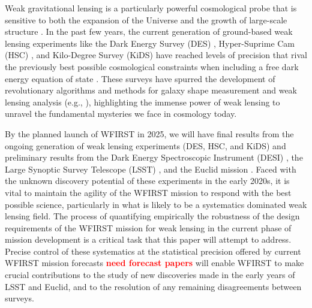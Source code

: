 \documentclass[aps,prd, amsmath,amssymb,superscriptaddress,showkeys,nofootinbib,reprint,preprintnumbers]{revtex4-1}
\newcommand{\verify}[1]{\textcolor{red}{\textbf{{#1}}}}
\begin{document}
Weak gravitational lensing is a particularly powerful cosmological probe that is sensitive to both the expansion of the Universe and the growth of large-scale structure \cite{2001PhR...340..291B,2017arXiv171003235M}. 
In the past few years, the current generation of ground-based weak lensing experiments like the Dark Energy Survey (DES) \cite{des}, Hyper-Suprime Cam (HSC) \cite{hsc}, and Kilo-Degree Survey (KiDS) \cite{kids} have reached levels of precision that rival the previously best possible cosmological constraints when including a free dark energy equation of state \cite{2018PhRvD..98d3528T,2019PASJ...71...43H,2018arXiv181206076H,2019PhRvL.122q1301A}. 
These surveys have spurred the development of revolutionary algorithms and methods for galaxy shape measurement and weak lensing analysis (e.g., \cite{HuffMandelbaum2017,SheldonHuff2017,shearcat}), highlighting the immense power of weak lensing to unravel the fundamental mysteries we face in cosmology today. 

By the planned launch of WFIRST in 2025, we will have final results from the ongoing generation of weak lensing experiments (DES, HSC, and KiDS) and preliminary results from the Dark Energy Spectroscopic Instrument (DESI) \cite{desi}, the Large Synoptic Survey Telescope (LSST) \cite{lsst}, and the Euclid mission \cite{euclid}. 
Faced with the unknown discovery potential of these experiments in the early 2020s, it is vital to maintain the agility of the WFIRST mission to respond with the best possible science, particularly in what is likely to be a systematics dominated weak lensing field.
The process of quantifying empirically the robustness of the design requirements of the WFIRST mission for weak lensing in the current phase of mission development is a critical task that this paper will attempt to address. 
Precise control of these systematics at the statistical precision offered by current WFIRST mission forecasts \cite{} \verify{need forecast papers} will enable WFIRST to make crucial contributions to the study of new discoveries made in the early years of LSST and Euclid, and to the resolution of any remaining disagreements between surveys.
\end{document}
